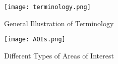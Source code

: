 \begin{figure} 
    \centering
    \begin{minipage}[c]{0.45\textwidth}
	\centering
	\texttt{[image: terminology.png]} 
	\caption{General Illustration of Terminology}
	\label{fig:terminology} 
    \end{minipage}
    \hfill
    \begin{minipage}[c]{0.45\textwidth}
	\centering
	\texttt{[image: AOIs.png]} 
	\caption{Different Types of Areas of Interest}
	\label{fig:AOIs} 
    \end{minipage} 
\end{figure}

%
%
%
%
%
